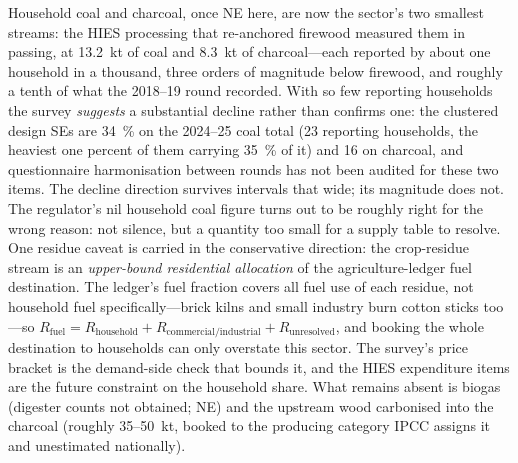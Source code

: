 Household coal and charcoal, once NE here, are now the sector's two smallest streams: the
HIES processing that re-anchored firewood measured them in passing, at \SI{13.2}{\kilo\tonne}
of coal and \SI{8.3}{\kilo\tonne} of charcoal---each reported by about one household in a
thousand, three orders of magnitude below firewood, and roughly a tenth of what the
2018--19 round recorded. With so few reporting households the survey \emph{suggests} a
substantial decline rather than confirms one: the clustered design SEs are
\SI{34}{\percent} on the 2024--25 coal total (23 reporting households, the heaviest
one percent of them carrying \SI{35}{\percent} of it) and \SI{16}{} on charcoal, and
questionnaire harmonisation between rounds has not been audited for these two items.
The decline direction survives intervals that wide; its magnitude does not. The regulator's
nil household coal figure turns out to be roughly right for the wrong reason: not silence,
but a quantity too small for a supply table to resolve. One residue caveat is carried in the conservative direction: the crop-residue stream
is an \emph{upper-bound residential allocation} of the agriculture-ledger fuel destination.
The ledger's fuel fraction covers all fuel use of each residue, not household fuel
specifically---brick kilns and small industry burn cotton sticks too---so
$R_{\text{fuel}} = R_{\text{household}} + R_{\text{commercial/industrial}} +
R_{\text{unresolved}}$, and booking the whole destination to households can only
overstate this sector. The survey's price bracket is the demand-side check that bounds
it, and the HIES expenditure items are the future constraint on the household share. What remains absent is biogas
(digester counts not obtained; NE) and the upstream wood carbonised into the charcoal
(roughly \SI{35}{}--\SI{50}{\kilo\tonne}, booked to the producing category IPCC assigns
it and unestimated nationally).
